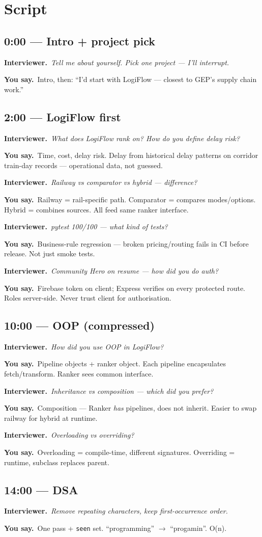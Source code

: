 \documentclass[11pt,a4paper]{article}
\newcommand{\IV}[1]{\par\vspace{4pt}\noindent\textcolor{qcol}{\textbf{Interviewer.}}~\textit{#1}\par}
\newcommand{\You}[1]{%
  \par\vspace{2pt}%
  \noindent\colorbox{youbg}{%
    \parbox{\dimexpr\textwidth-2\fboxsep}{\vspace{3pt}\textcolor{you}{\textbf{\small You say.}}~#1\vspace{3pt}}%
  }\par}
\begin{document}
\section{Script}

\subsection*{0:00 --- Intro + project pick}
\IV{Tell me about yourself. Pick one project --- I'll interrupt.}
\You{Intro, then: ``I'd start with LogiFlow --- closest to GEP's supply chain work.''}

\subsection*{2:00 --- LogiFlow first}
\IV{What does LogiFlow rank on? How do you define delay risk?}
\You{Time, cost, delay risk. Delay from historical delay patterns on corridor train-day records --- operational data, not guessed.}

\IV{Railway vs comparator vs hybrid --- difference?}
\You{Railway = rail-specific path. Comparator = compares modes/options. Hybrid = combines sources. All feed same ranker interface.}

\IV{pytest 100/100 --- what kind of tests?}
\You{Business-rule regression --- broken pricing/routing fails in CI before release. Not just smoke tests.}

\IV{Community Hero on resume --- how did you do auth?}
\You{Firebase token on client; Express verifies on every protected route. Roles server-side. Never trust client for authorisation.}

\subsection*{10:00 --- OOP (compressed)}
\IV{How did you use OOP in LogiFlow?}
\You{Pipeline objects + ranker object. Each pipeline encapsulates fetch/transform. Ranker sees common interface.}

\IV{Inheritance vs composition --- which did you prefer?}
\You{Composition --- Ranker \emph{has} pipelines, does not inherit. Easier to swap railway for hybrid at runtime.}

\IV{Overloading vs overriding?}
\You{Overloading = compile-time, different signatures. Overriding = runtime, subclass replaces parent.}

\subsection*{14:00 --- DSA}
\IV{Remove repeating characters, keep first-occurrence order.}
\You{One pass + \texttt{seen} set. ``programming'' $\rightarrow$ ``progamin''. O(n).}
\end{document}
